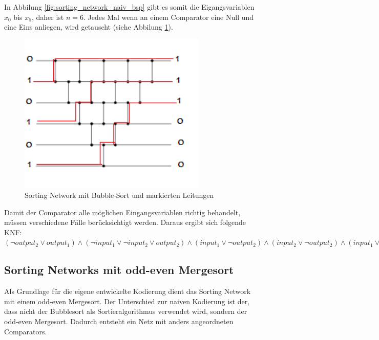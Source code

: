 \documentclass[a4,abstract=on]{scrartcl}
\begin{document}
In Abbilung \ref{fig:sorting_network_naiv_bsp} gibt es somit die Eigangsvariablen $x_0$ bis $x_5$, daher ist $n=6$. Jedes Mal wenn an einem Comparator eine Null und eine Eins anliegen, wird getauscht (siehe Abbilung \ref{fig:sorting_network_naiv_bsp1}).

\begin{figure}[H]
\centering
\includegraphics[width=9cm]{sorting_network_bubble_rot.png}
\caption{Sorting Network mit Bubble-Sort und markierten Leitungen}
\label{fig:sorting_network_naiv_bsp1}
\end{figure}

Damit der Comparator alle möglichen Eingangsvariablen richtig behandelt, müssen verschiedene Fälle berücksichtigt werden. Daraus ergibt sich folgende KNF:\\
$(\neg output_2 \vee output_1) \wedge (\neg input_1 \vee \neg input_2 \vee output_2) \wedge (input_1 \vee \neg output_2) \wedge (input_2 \vee \neg output_2) \wedge (input_1 \vee input_2 \vee \neg output_1) \wedge (\neg input_1 \vee output_1) \wedge (\neg input_2 \vee output_1)$

	\subsection{Sorting Networks mit odd-even Mergesort}
Als Grundlage für die eigene entwickelte Kodierung dient das Sorting Network mit einem odd-even Mergesort. Der Unterschied zur naiven Kodierung ist der, dass nicht der Bubblesort als Sortieralgorithmus verwendet wird, sondern der odd-even Mergesort. Dadurch entsteht ein Netz mit anders angeordneten Comparators.
\end{document}
